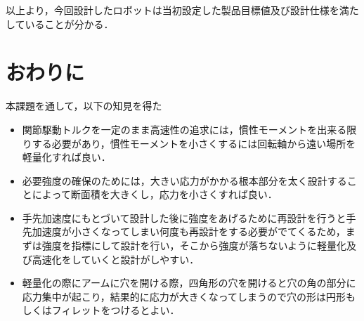 以上より，今回設計したロボットは当初設定した製品目標値及び設計仕様を満たしていることが分かる．

\section{おわりに}\label{ux304aux308fux308aux306b}

本課題を通して，以下の知見を得た

\begin{itemize}
\item
  関節駆動トルクを一定のまま高速性の追求には，慣性モーメントを出来る限りする必要があり，慣性モーメントを小さくするには回転軸から遠い場所を軽量化すれば良い．
\item
  必要強度の確保のためには，大きい応力がかかる根本部分を太く設計することによって断面積を大きくし，応力を小さくすれば良い．
\item
  手先加速度にもとづいて設計した後に強度をあげるために再設計を行うと手先加速度が小さくなってしまい何度も再設計をする必要がでてくるため，まずは強度を指標にして設計を行い，そこから強度が落ちないように軽量化及び高速化をしていくと設計がしやすい．
\item
  軽量化の際にアームに穴を開ける際，四角形の穴を開けると穴の角の部分に応力集中が起こり，結果的に応力が大きくなってしまうので穴の形は円形もしくはフィレットをつけるとよい．
\end{itemize}

